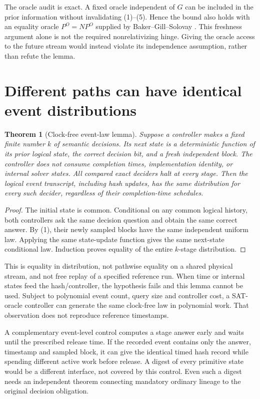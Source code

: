 \documentclass[11pt]{article}
\newtheorem{theorem}{Theorem}
\begin{document}
The oracle audit is exact. A fixed oracle independent of $G$ can be included
in the prior information without invalidating (1)--(5). Hence the bound also
holds with an equality oracle $P^O=NP^O$ supplied by Baker--Gill--Solovay
\cite{bgs}. This freshness argument alone is not the required nonrelativizing
hinge. Giving the oracle access to the future stream would instead violate
its independence assumption, rather than refute the lemma.

\section{Different paths can have identical event distributions}
\begin{theorem}[Clock-free event-law lemma]\label{thm:law}
Suppose a controller makes a fixed finite number $k$ of semantic decisions.
Its next state is a deterministic function of its prior logical state, the
correct decision bit, and a fresh independent block. The controller does not
consume completion times, implementation identity, or internal solver states.
All compared exact deciders halt at every stage. Then the logical event
transcript, including hash updates, has the same distribution for every such
decider, regardless of their completion-time schedules.
\end{theorem}
\begin{proof}
The initial state is common. Conditional on any common logical history, both
controllers ask the same decision question and obtain the same correct answer.
By (1), their newly sampled blocks have the same independent uniform law.
Applying the same state-update function gives the same next-state conditional
law. Induction proves equality of the entire $k$-stage distribution.
\end{proof}

This is equality in distribution, not pathwise equality on a shared physical
stream, and not free replay of a specified reference run. When time or internal
states feed the hash/controller, the hypothesis fails and this lemma cannot
be used. Subject to polynomial event count, query size and controller cost,
a SAT-oracle controller can generate the same clock-free law in polynomial
work. That observation does not reproduce reference timestamps.

A complementary event-level control computes a stage answer early and waits
until the prescribed release time. If the recorded event contains only the
answer, timestamp and sampled block, it can give the identical timed hash
record while spending different active work before release. A digest of every
primitive state would be a different interface, not covered by this control.
Even such a digest needs an independent theorem connecting mandatory ordinary
lineage to the original decision obligation.
\end{document}
